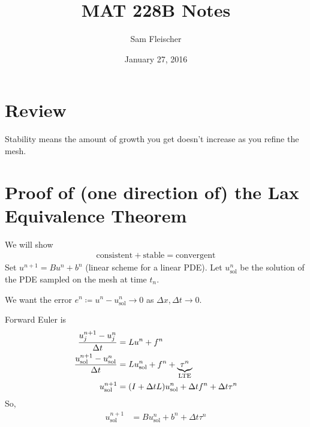 \documentclass{article}
\title{MAT 228B Notes}
\author{Sam Fleischer}
\date{January 27, 2016}
\newcommand{\Dx}{\Delta x}
\newcommand{\Dt}{\Delta t}
\newcommand{\centdiff}{\frac{u_j^{n+1} - u_j^n}{\Dt}}
\begin{document}
    \maketitle

    \section{Review}
        Stability means the amount of growth you get doesn't increase as you refine the mesh.

    \section{Proof of (one direction of) the Lax Equivalence Theorem}
        We will show
        \begin{align*}
            \text{consistent} + \text{stable} = \text{convergent}
        \end{align*}
        Set $u^{n+1} = Bu^n + b^n$ (linear scheme for a linear PDE).  Let $u_\text{sol}^n$ be the solution of the PDE sampled on the mesh at time $t_n$.

        We want the error $e^n \coloneqq u^n - u_\text{sol}^n \rightarrow 0$ as $\Dx,\Dt \rightarrow 0$.

        \begin{adjustwidth}{1in}{0in}
            Forward Euler is
            \begin{align*}
                \centdiff &= Lu^n + f^n \\
                \frac{u_\text{sol}^{n+1} - u_\text{sol}^n}{\Dt} &= Lu_\text{sol}^n + f^n + \underbrace{\tau^n}_\text{LTE} \\
                u_\text{sol}^{n+1} &= \qty(I + \Dt L)u_\text{sol}^n + \Dt f^n + \Dt \tau^n
            \end{align*}
            So,
            \begin{align*}
                u_\text{sol}^{n+1} &= Bu_\text{sol}^n + b^n + \Dt \tau^n
            \end{align*}
        \end{adjustwidth}
\end{document}

